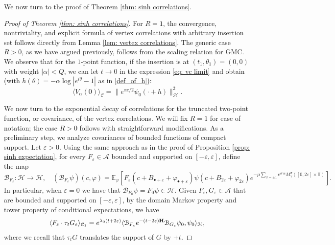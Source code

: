 \documentclass[11pt]{amsart}
\numberwithin{equation}{section}
\theoremstyle{definition}
\newcommand{\cjd}{\rangle}
\newcommand{\cjg}{\langle}
\newcommand{\mc}{\mathcal}
\def\eps{\varepsilon}
\def\T{\mathbb{T}}
\begin{document}
We now turn to the proof of Theorem \ref{thm: sinh correlations}.
\begin{proof}[Proof of Theorem \ref{thm: sinh correlations}]
For $R=1$, the convergence, nontriviality, and explicit formula of vertex correlations with arbitrary insertion set follows directly from Lemma \ref{lem: vertex correlations}. The generic case $R>0$, as we have argued previously, follows from the scaling relation for GMC. We observe that for the $1$-point function, if the insertion is at $(t_1,\theta_1)=(0,0)$ with weight $|\alpha|<Q$, we can let $t\to 0$ in the expression \eqref{eq: vc limit} and obtain (with $h(\theta)=-\alpha \log|e^{i\theta}-1|$ as in \eqref{def_of_h}):
\begin{equation}\label{1-point}
\cjg V_{\alpha}(0)\cjd_{\mc{C}}=  \|e^{\alpha c/2} \psi_0(\cdot + h)\|^2_{\mc{H}}.
\end{equation}


We now turn to the exponential decay of correlations for the truncated two-point function, or covariance, of the vertex correlations. We will fix $R=1$ for ease of notation; the case $R>0$ follows with straightforward modifications. As a preliminary step, we analyze covariances of bounded functions of compact support. Let $\eps > 0$. Using the same approach as in the proof of Proposition \ref{prop: sinh expectation}, for every $F_\eps \in \mathcal A$ bounded and supported on $[-\eps,\eps]$, define the map
\begin{equation}
\mc{B}_{F_\eps}:\mathcal H \rightarrow \mathcal H, \quad (\mc{B}_{F_\eps} \psi)(c,\varphi) = \mathbb E_\varphi[F_\eps(c+B_{\bullet +\eps} +\varphi_{\bullet +\eps}) \psi(c+B_{2\eps}+\varphi_{2\eps})e^{-\mu  \sum_{\sigma = \pm 1} e^{\sigma\gamma c}M_\gamma^\sigma([0,2\eps]\times\T)}].
\end{equation}
In particular, when $\eps = 0$ we have that $\mc{B}_{F_0}\psi = F_0 \psi  \in \mathcal {H}$. Given $F_\eps,G_\eps \in \mathcal A$ that are bounded and supported on $[-\eps,\eps]$, by the domain Markov property and tower property of conditional expectations, we have
\begin{equation}
\begin{split}
\langle F_\eps \cdot \tau_{t} G_\eps \rangle_{\mathcal C_1} =
 e^{\lambda_0 (t+2\eps)} \cjg \mc{B}_{F_\eps}e^{-(t-2\eps){\bf H}}\mc{B}_{G_\eps}\psi_0,\psi_0\cjd_{\mc{H}},
\end{split}
\end{equation}
where we recall that $\tau_t G$ translates the support of $G$ by $+t$. 


\end{proof}
\end{document}

